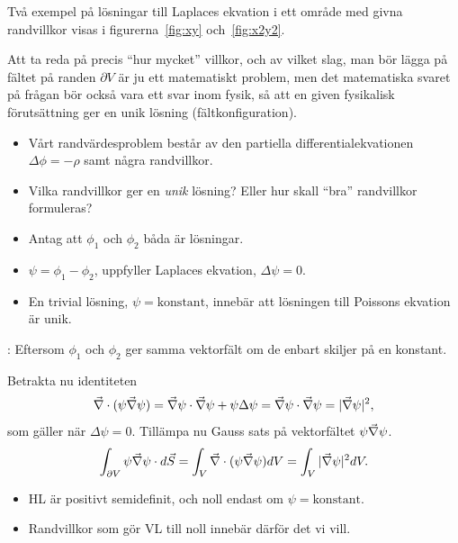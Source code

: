\documentclass[%
oneside,                 %
final,                   %
10pt]{article}
\newcommand{\shortinlinecomment}[3]{{\color{red}{\bf #1}: #2}}
\newenvironment{warning_mdfboxadmon}[1][]{
\begin{warning_mdfboxmdframed}[frametitle=#1]
}
{
\end{warning_mdfboxmdframed}
}
\begin{document}
Två exempel på lösningar till Laplaces ekvation i ett område med givna randvillkor visas i figurerna~\ref{fig:xy} och~\ref{fig:x2y2}.



\begin{warning_mdfboxadmon}[Kommentar]
Att ta reda på precis ``hur mycket'' villkor, och av vilket slag, man bör lägga på fältet på randen $\partial V$ är ju ett matematiskt problem, men det matematiska svaret på frågan bör också vara ett svar inom fysik, så att en given fysikalisk förutsättning ger en unik lösning (fältkonfiguration).
\end{warning_mdfboxadmon} %



\begin{itemize}
\item Vårt randvärdesproblem består av den partiella differentialekvationen $\Delta\phi=-\rho$ samt några randvillkor. 

\item Vilka randvillkor ger en \emph{unik} lösning? Eller hur skall ``bra'' randvillkor formuleras? 

\item Antag att $\phi_1$ och $\phi_2$ båda är lösningar. 

\item $\psi=\phi_1-\phi_2$, uppfyller Laplaces ekvation, $\Delta\psi=0$. 

\item En trivial lösning, $\psi=\mathrm{konstant}$, innebär att lösningen till Poissons ekvation är unik.
\end{itemize}

\noindent
\shortinlinecomment{Kommentar 3}{ Eftersom $\phi_1$ och $\phi_2$ ger samma vektorfält om de enbart skiljer på en konstant. }{ Eftersom $\phi_1$ och $\phi_2$ }

Betrakta nu identiteten
$$
\vec{\nabla}\cdot(\psi\vec{\nabla}\psi)=\vec{\nabla}\psi\cdot\vec{\nabla}\psi+\psi\Delta\psi
=\vec{\nabla}\psi\cdot\vec{\nabla}\psi=|\vec{\nabla}\psi|^2,
$$
som gäller när $\Delta\psi=0$. Tillämpa nu Gauss sats på vektorfältet $\psi\vec{\nabla}\psi$. 
$$
\int_{\partial V}\psi\vec{\nabla}\psi\cdot d\vec S = \int_V \vec{\nabla}\cdot(\psi\vec{\nabla}\psi) dV = \int_V|\vec{\nabla}\psi|^2dV.
$$
\begin{itemize}
\item HL är positivt semidefinit, och noll endast om $\psi = \mathrm{konstant}$. 

\item Randvillkor som gör VL till noll innebär därför det vi vill.
\end{itemize}
\end{document}
